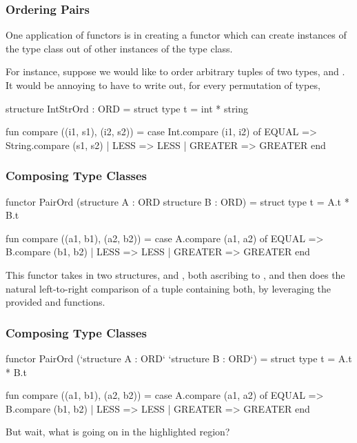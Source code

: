 \documentclass[aspectratio=169, handout]{beamer}
\begin{document}
\begin{frame}[fragile]
  \frametitle{Ordering Pairs}

  One application of functors is in creating a functor which can create instances
  of the  type class out of other instances of the  type class.

  \pause
  \vspace{\fill}

  For instance, suppose we would like to order arbitrary tuples of two types,
   and . It would be annoying to have to write out, for every
  permutation of types,

  \pause
  \vspace{\fill}

  \begin{codeblock}
    structure IntStrOrd : ORD =
      struct
        type t = int * string

        fun compare ((i1, s1), (i2, s2)) =
          case Int.compare (i1, i2) of
            EQUAL   => String.compare (s1, s2)
          | LESS    => LESS
          | GREATER => GREATER
      end
  \end{codeblock}
\end{frame}

\begin{frame}[fragile]
  \frametitle{Composing Type Classes}

  \begin{codeblock}
    functor PairOrd (structure A : ORD
                     structure B : ORD) =
      struct
        type t = A.t * B.t

        fun compare ((a1, b1), (a2, b2)) =
          case A.compare (a1, a2) of
            EQUAL   => B.compare (b1, b2)
          | LESS    => LESS
          | GREATER => GREATER
      end
  \end{codeblock}

  \pause
  \vspace{\fill}

  This functor takes in two structures,  and , both ascribing
  to , and then does the natural left-to-right comparison of a
  tuple containing both, by leveraging the provided  and
   functions.
\end{frame}

\begin{frame}[fragile]
  \frametitle{Composing Type Classes}

  \begin{codeblock}
    functor PairOrd (`structure A : ORD`
                     `structure B : ORD`) =
      struct
        type t = A.t * B.t

        fun compare ((a1, b1), (a2, b2)) =
          case A.compare (a1, a2) of
            EQUAL   => B.compare (b1, b2)
          | LESS    => LESS
          | GREATER => GREATER
      end
  \end{codeblock}

  \pause
  \vspace{\fill}

  But wait, what is going on in the highlighted region?
\end{frame}
\end{document}
